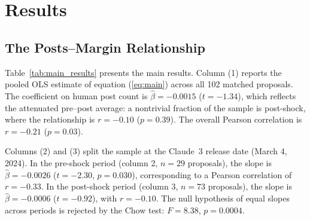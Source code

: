 \documentclass[12pt]{article}
\begin{document}
\section{Results}
\label{sec:results}


\subsection{The Posts--Margin Relationship}

Table~\ref{tab:main_results} presents the main results. Column (1) reports the
pooled OLS estimate of equation (\ref{eq:main}) across all 102 matched proposals.
The coefficient on human post count is $\hat{\beta} = -0.0015$ ($t = -1.34$), which reflects the attenuated pre--post average:
a nontrivial fraction of the sample is post-shock, where the relationship is
$r = -0.10$ ($p = 0.39$). The overall Pearson correlation is $r = -0.21$ ($p = 0.03$).

Columns (2) and (3) split the sample at the Claude~3 release date (March 4, 2024).
In the pre-shock period (column 2, $n = 29$ proposals), the slope is
$\hat{\beta} = -0.0026$ ($t = -2.30$, $p = 0.030$), corresponding to a Pearson
correlation of $r = -0.33$. In the post-shock period (column 3, $n = 73$
proposals), the slope is $\hat{\beta} = -0.0006$ ($t = -0.92$), with
$r = -0.10$. The null hypothesis of equal slopes across periods is rejected
by the Chow test: $F = 8.38$, $p = 0.0004$.
\end{document}
